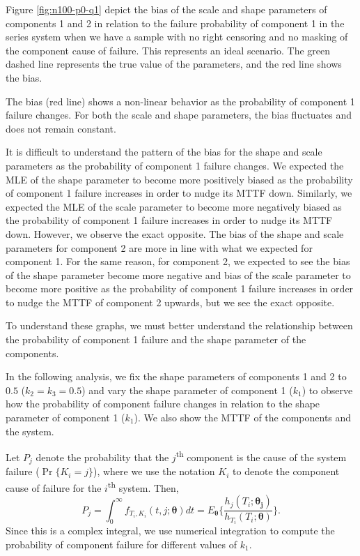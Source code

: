 \documentclass[
]{article}
\begin{document}
Figure \ref{fig:n100-p0-q1} depict the bias of the scale and shape
parameters of components 1 and 2 in relation to the failure probability
of component 1 in the series system when we have a sample with no right
censoring and no masking of the component cause of failure. This
represents an ideal scenario. The green dashed line represents the true
value of the parameters, and the red line shows the bias.

The bias (red line) shows a non-linear behavior as the probability of
component 1 failure changes. For both the scale and shape parameters,
the bias fluctuates and does not remain constant.

It is difficult to understand the pattern of the bias for the shape and
scale parameters as the probability of component 1 failure changes. We
expected the MLE of the shape parameter to become more positively biased
as the probability of component 1 failure increases in order to nudge
its MTTF down. Similarly, we expected the MLE of the scale parameter to
become more negatively biased as the probability of component 1 failure
increases in order to nudge its MTTF down. However, we observe the exact
opposite. The bias of the shape and scale parameters for component 2 are
more in line with what we expected for component 1. For the same reason,
for component 2, we expected to see the bias of the shape parameter
become more negative and bias of the scale parameter to become more
positive as the probability of component 1 failure increases in order to
nudge the MTTF of component 2 upwards, but we see the exact opposite.

To understand these graphs, we must better understand the relationship
between the probability of component 1 failure and the shape parameter
of the components.

In the following analysis, we fix the shape parameters of components 1
and 2 to \(0.5\) (\(k_2 = k_3 = 0.5\)) and vary the shape parameter of
component 1 (\(k_1\)) to observe how the probability of component
failure changes in relation to the shape parameter of component 1
(\(k_1\)). We also show the MTTF of the components and the system.

Let \(P_j\) denote the probability that the \(j\)\textsuperscript{th}
component is the cause of the system failure (\(\Pr\{K_i = j\}\)), where
we use the notation \(K_i\) to denote the component cause of failure for
the \(i\)\textsuperscript{th} system. Then, \[
    P_j = \int_{0}^\infty f_{T_i, K_i}(t, j ; \boldsymbol{\theta}) dt =
        E_{\boldsymbol{\theta}}\biggl\{ \frac{h_j(T_i;\boldsymbol{\theta_j})}{h_{T_i}(T_i;\boldsymbol{\theta})} \biggr\}.
\] Since this is a complex integral, we use numerical integration to
compute the probability of component failure for different values of
\(k_1\).
\end{document}
